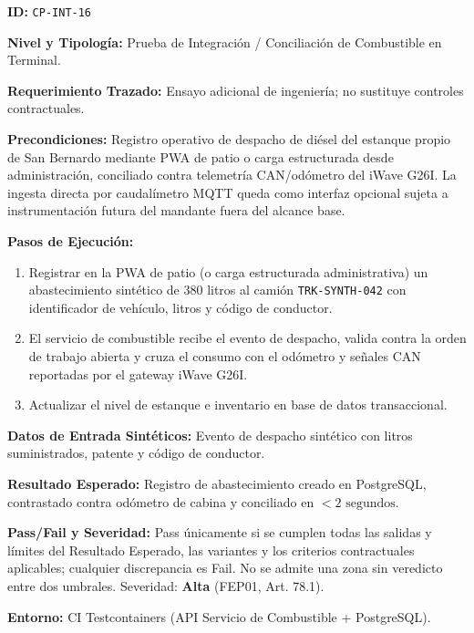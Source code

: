 \par\noindent\textbf{ID:} \texttt{C\allowbreak{}P\allowbreak{}-\allowbreak{}I\allowbreak{}N\allowbreak{}T\allowbreak{}-\allowbreak{}1\allowbreak{}6\allowbreak{}}\par
\par\noindent\textbf{Nivel y Tipología:} Prueba de Integración / Conciliación de Combustible en Terminal.\par
\par\noindent\textbf{Requerimiento Trazado:} Ensayo adicional de ingeniería; no sustituye controles contractuales.\par
\par\noindent\textbf{Precondiciones:} Registro operativo de despacho de diésel del estanque propio de San Bernardo mediante PWA de patio o carga estructurada desde administración, conciliado contra telemetría CAN/odómetro del iWave G26I. La ingesta directa por caudalímetro MQTT queda como interfaz opcional sujeta a instrumentación futura del mandante fuera del alcance base.\par
\par\noindent\textbf{Pasos de Ejecución:} \par
\begin{enumerate}
\item Registrar en la PWA de patio (o carga estructurada administrativa) un abastecimiento sintético de 380 litros al camión \texttt{T\allowbreak{}R\allowbreak{}K\allowbreak{}-\allowbreak{}S\allowbreak{}Y\allowbreak{}N\allowbreak{}T\allowbreak{}H\allowbreak{}-\allowbreak{}0\allowbreak{}4\allowbreak{}2\allowbreak{}} con identificador de vehículo, litros y código de conductor.
\item El servicio de combustible recibe el evento de despacho, valida contra la orden de trabajo abierta y cruza el consumo con el odómetro y señales CAN reportadas por el gateway iWave G26I.
\item Actualizar el nivel de estanque e inventario en base de datos transaccional.
\end{enumerate}
\par\noindent\textbf{Datos de Entrada Sintéticos:} Evento de despacho sintético con litros suministrados, patente y código de conductor.\par
\par\noindent\textbf{Resultado Esperado:} Registro de abastecimiento creado en PostgreSQL, contrastado contra odómetro de cabina y conciliado en \(< 2\text{ segundos}\).\par
\par\noindent\textbf{Pass/Fail y Severidad:} Pass únicamente si se cumplen todas las salidas y límites del Resultado Esperado, las variantes y los criterios contractuales aplicables; cualquier discrepancia es Fail. No se admite una zona sin veredicto entre dos umbrales. Severidad: \textbf{Alta} (FEP01, Art. 78.1).\par
\par\noindent\textbf{Entorno:} CI Testcontainers (API Servicio de Combustible + PostgreSQL).\par







